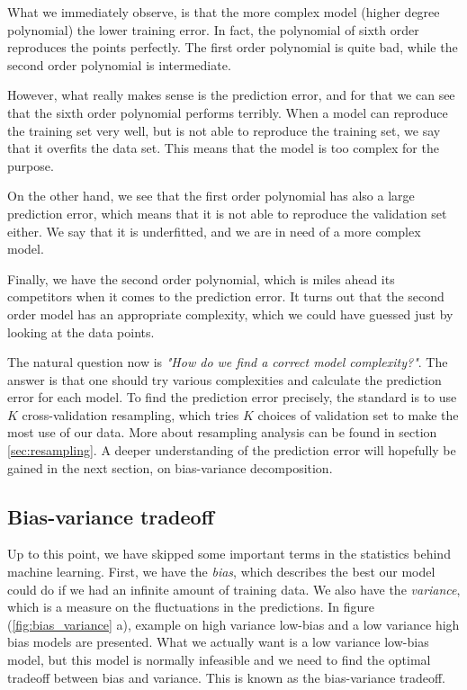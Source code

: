 What we immediately observe, is that the more complex model (higher degree polynomial) the lower training error. In fact, the polynomial of sixth order reproduces the points perfectly. The first order polynomial is quite bad, while the second order polynomial is intermediate.

However, what really makes sense is the prediction error, and for that we can see that the sixth order polynomial performs terribly. When a model can reproduce the training set very well, but is not able to reproduce the training set, we say that it overfits the data set. This means that the model is too complex for the purpose.

On the other hand, we see that the first order polynomial has also a large prediction error, which means that it is not able to reproduce the validation set either. We say that it is underfitted, and we are in need of a more complex model.

Finally, we have the second order polynomial, which is miles ahead its competitors when it comes to the prediction error. It turns out that the second order model has an appropriate complexity, which we could have guessed just by looking at the data points.

The natural question now is \textit{"How do we find a correct model complexity?"}. The answer is that one should try various complexities and calculate the prediction error for each model. To find the prediction error precisely, the standard is to use $K$ cross-validation resampling, which tries $K$ choices of validation set to make the most use of our data. More about resampling analysis can be found in section \eqref{sec:resampling}. A deeper understanding of the prediction error will hopefully be gained in the next section, on bias-variance decomposition. 

\subsection{Bias-variance tradeoff}
Up to this point, we have skipped some important terms in the statistics behind machine learning. First, we have the \textit{bias}, which describes the best our model could do if we had an infinite amount of training data. We also have the \textit{variance}, which is a measure on the fluctuations in the predictions. In figure (\ref{fig:bias_variance} a), example on high variance low-bias and a low variance high bias models are presented. What we actually want is a low variance low-bias model, but this model is normally infeasible and we need to find the optimal tradeoff between bias and variance. This is known as the bias-variance tradeoff. 

